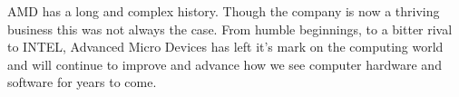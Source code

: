 \documentclass[../computer-history.tex]{subfiles}
\begin{document}
AMD has a long and complex history. Though the company is now a thriving business this was not always the case. From humble beginnings, to a bitter rival to INTEL, Advanced Micro Devices has left it's mark on the computing world and will continue to improve and advance how we see computer hardware and software for years to come.
\biblio
\end{document}
